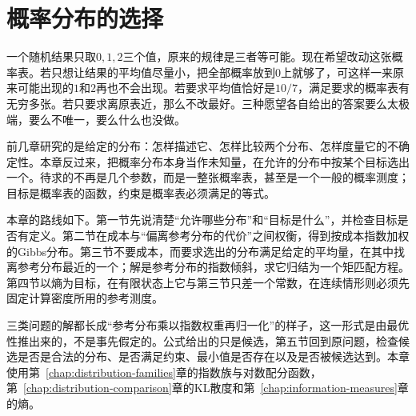\chapter{概率分布的选择}
\label{chap:distribution-selection}

一个随机结果只取$0,1,2$三个值，原来的规律是三者等可能。现在希望改动这张概率表。若只想让结果的平均值尽量小，把全部概率放到$0$上就够了，可这样一来原来可能出现的$1$和$2$再也不会出现。若要求平均值恰好是$10/7$，满足要求的概率表有无穷多张。若只要求离原表近，那么不改最好。三种愿望各自给出的答案要么太极端，要么不唯一，要么什么也没做。

前几章研究的是给定的分布：怎样描述它、怎样比较两个分布、怎样度量它的不确定性。本章反过来，把概率分布本身当作未知量，在允许的分布中按某个目标选出一个。待求的不再是几个参数，而是一整张概率表，甚至是一个一般的概率测度；目标是概率表的函数，约束是概率表必须满足的等式。

本章的路线如下。第一节先说清楚“允许哪些分布”和“目标是什么”，并检查目标是否有定义。第二节在成本与“偏离参考分布的代价”之间权衡，得到按成本指数加权的Gibbs分布。第三节不要成本，而要求选出的分布满足给定的平均量，在其中找离参考分布最近的一个；解是参考分布的指数倾斜，求它归结为一个矩匹配方程。第四节以熵为目标，在有限状态上它与第三节只差一个常数，在连续情形则必须先固定计算密度所用的参考测度。

三类问题的解都长成“参考分布乘以指数权重再归一化”的样子，这一形式是由最优性推出来的，不是事先假定的。公式给出的只是候选，第五节回到原问题，检查候选是否是合法的分布、是否满足约束、最小值是否存在以及是否被候选达到。本章使用第~\ref{chap:distribution-families}章的指数族与对数配分函数，第~\ref{chap:distribution-comparison}章的KL散度和第~\ref{chap:information-measures}章的熵。












